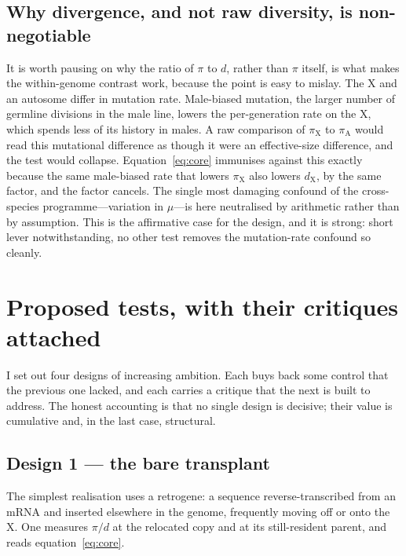 \documentclass[11pt,a4paper]{article}
\begin{document}
\subsection{Why divergence, and not raw diversity, is non-negotiable}

It is worth pausing on why the ratio of $\pi$ to $d$, rather than $\pi$ itself, is what makes the within-genome contrast work, because the point is easy to mislay. The X and an autosome differ in mutation rate. Male-biased mutation, the larger number of germline divisions in the male line, lowers the per-generation rate on the X, which spends less of its history in males. A raw comparison of $\pi_{\mathrm X}$ to $\pi_{\mathrm A}$ would read this mutational difference as though it were an effective-size difference, and the test would collapse. Equation~\eqref{eq:core} immunises against this exactly because the same male-biased rate that lowers $\pi_{\mathrm X}$ also lowers $d_{\mathrm X}$, by the same factor, and the factor cancels. The single most damaging confound of the cross-species programme---variation in $\mu$---is here neutralised by arithmetic rather than by assumption. This is the affirmative case for the design, and it is strong: short lever notwithstanding, no other test removes the mutation-rate confound so cleanly.

\section{Proposed tests, with their critiques attached}

I set out four designs of increasing ambition. Each buys back some control that the previous one lacked, and each carries a critique that the next is built to address. The honest accounting is that no single design is decisive; their value is cumulative and, in the last case, structural.

\subsection{Design 1 --- the bare transplant}

The simplest realisation uses a retrogene: a sequence reverse-transcribed from an mRNA and inserted elsewhere in the genome, frequently moving off or onto the X. One measures $\pi/d$ at the relocated copy and at its still-resident parent, and reads equation~\eqref{eq:core}.
\end{document}
